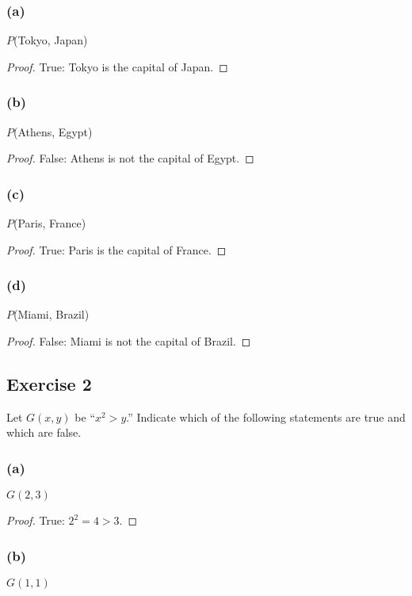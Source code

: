 \documentclass[14pt]{extarticle}
\begin{document}
\subsubsection{(a)}
$P$(Tokyo, Japan)

\begin{proof}
    True: Tokyo is the capital of Japan.
\end{proof}

\subsubsection{(b)}
$P$(Athens, Egypt)

\begin{proof}
    False: Athens is not the capital of Egypt.
\end{proof}

\subsubsection{(c)}
$P$(Paris, France)

\begin{proof}
    True: Paris is the capital of France.
\end{proof}

\subsubsection{(d)}
$P$(Miami, Brazil)

\begin{proof}
    False: Miami is not the capital of Brazil.
\end{proof}

\subsection{Exercise 2}
Let $G(x, y)$ be “$x^2 > y$.” Indicate which of the following statements are true and which are false.

\subsubsection{(a)}
$G(2, 3)$

\begin{proof}
    True: $2^2 = 4 > 3$.
\end{proof}

\subsubsection{(b)}
$G(1, 1)$
\end{document}
